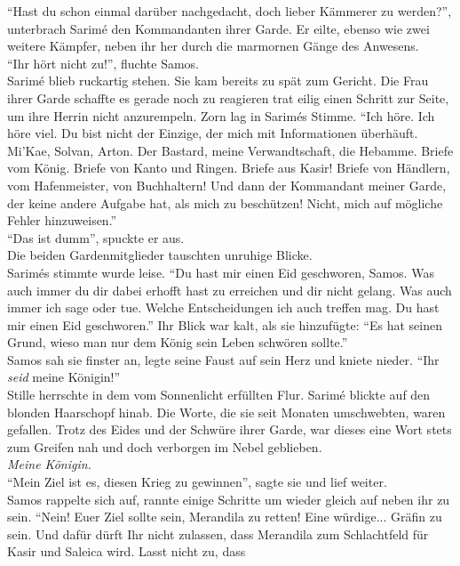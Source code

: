 ``Hast du schon einmal darüber nachgedacht, doch lieber Kämmerer zu werden?'', unterbrach Sarimé 
den Kommandanten ihrer Garde. Er eilte, ebenso wie zwei weitere Kämpfer, neben ihr her durch die 
marmornen Gänge des Anwesens.\\
``Ihr hört nicht zu!'', fluchte Samos.\\
Sarimé blieb ruckartig stehen. Sie kam bereits zu spät zum Gericht. Die Frau ihrer Garde schaffte 
es gerade noch zu reagieren trat eilig einen Schritt zur Seite, um ihre Herrin nicht anzurempeln. 
Zorn lag in Sarimés Stimme. ``Ich höre. Ich höre viel. Du bist nicht der Einzige, der mich mit 
Informationen überhäuft. Mi'Kae, Solvan, Arton. Der Bastard, meine Verwandtschaft, die Hebamme. 
Briefe vom König. Briefe von Kanto und Ringen. Briefe aus Kasir! Briefe von Händlern, vom 
Hafenmeister, von Buchhaltern! Und dann der Kommandant meiner Garde, der keine andere Aufgabe hat, 
als mich zu beschützen! Nicht, mich auf mögliche Fehler hinzuweisen.''\\
``Das ist dumm'', spuckte er aus.\\
Die beiden Gardenmitglieder tauschten unruhige Blicke.\\
Sarimés stimmte wurde leise. ``Du hast mir einen Eid geschworen, Samos. Was auch immer du dir dabei 
erhofft hast zu erreichen und dir nicht gelang. Was auch immer ich sage oder tue. Welche 
Entscheidungen ich auch treffen mag. Du hast mir einen Eid geschworen.'' Ihr Blick war kalt, als 
sie hinzufügte: ``Es hat seinen Grund, wieso man nur dem König sein Leben schwören sollte.''\\
Samos sah sie finster an, legte seine Faust auf sein Herz und kniete nieder. ``Ihr 
\textit{seid} meine Königin!''\\
Stille herrschte in dem vom Sonnenlicht erfüllten Flur. Sarimé blickte auf den blonden Haarschopf 
hinab. Die Worte, die sie seit Monaten umschwebten, waren gefallen. Trotz des Eides und der Schwüre 
ihrer Garde, war dieses eine Wort stets zum Greifen nah und doch verborgen im Nebel geblieben.\\
\textit{Meine Königin.}\\
``Mein Ziel ist es, diesen Krieg zu gewinnen'', sagte sie und lief weiter.\\
Samos rappelte sich auf, rannte einige Schritte um wieder gleich auf neben ihr zu sein. ``Nein! 
Euer Ziel sollte sein, Merandila zu retten! Eine würdige... Gräfin zu sein. Und dafür dürft Ihr 
nicht zulassen, dass Merandila zum Schlachtfeld für Kasir und Saleica wird. Lasst nicht zu, dass 
